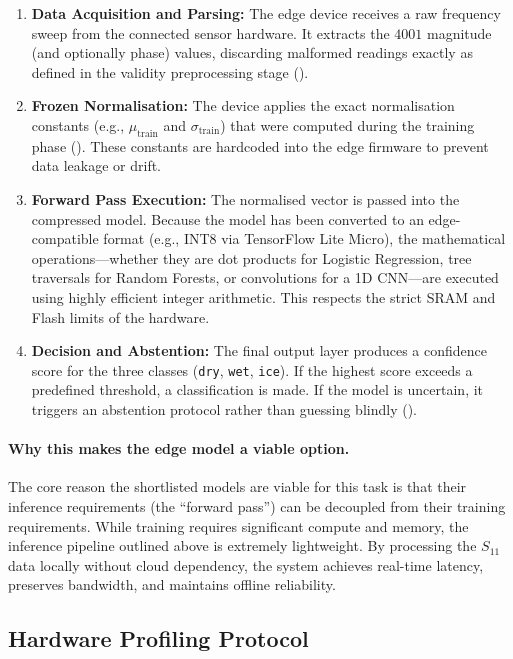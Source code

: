 \begin{enumerate}
  \item \textbf{Data Acquisition and Parsing:} The edge device receives a raw frequency sweep from the connected sensor hardware. It extracts the $4001$ magnitude (and optionally phase) values, discarding malformed readings exactly as defined in the validity preprocessing stage ().
  \item \textbf{Frozen Normalisation:} The device applies the exact normalisation constants (e.g., $\mu_{\text{train}}$ and $\sigma_{\text{train}}$) that were computed during the training phase (). These constants are hardcoded into the edge firmware to prevent data leakage or drift.
  \item \textbf{Forward Pass Execution:} The normalised vector is passed into the compressed model. Because the model has been converted to an edge-compatible format (e.g., INT8 via TensorFlow Lite Micro), the mathematical operations---whether they are dot products for Logistic Regression, tree traversals for Random Forests, or convolutions for a 1D CNN---are executed using highly efficient integer arithmetic. This respects the strict SRAM and Flash limits of the hardware.
  \item \textbf{Decision and Abstention:} The final output layer produces a confidence score for the three classes (\texttt{dry}, \texttt{wet}, \texttt{ice}). If the highest score exceeds a predefined threshold, a classification is made. If the model is uncertain, it triggers an abstention protocol rather than guessing blindly ().
\end{enumerate}

\paragraph{Why this makes the edge model a viable option.}
The core reason the shortlisted models are viable for this task is that their inference requirements (the ``forward pass'') can be decoupled from their training requirements. While training requires significant compute and memory, the inference pipeline outlined above is extremely lightweight. By processing the $S_{11}$ data locally without cloud dependency, the system achieves real-time latency, preserves bandwidth, and maintains offline reliability.

\subsection{Hardware Profiling Protocol}
\label{subsec:hw_profiling}

